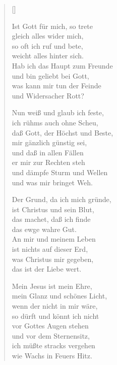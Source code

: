 \begin{multicols}{2}
\settowidth{\versewidth}{Der Grund, da ich mich gründe}
\begin{verse}[\versewidth]

 Ist Gott für mich, so trete\\
gleich alles wider mich,\\
so oft ich ruf und bete,\\
weicht alles hinter sich.\\
Hab ich das Haupt zum Freunde\\
und bin geliebt bei Gott,\\
was kann mir tun der Feinde\\
und Widersacher Rott?

 Nun weiß und glaub ich feste,\\
ich rühms auch ohne Scheu,\\
daß Gott, der Höchst und Beste,\\
mir gänzlich günstig sei,\\
und daß in allen Fällen\\
er mir zur Rechten steh\\
und dämpfe Sturm und Wellen\\
und was mir bringet Weh.

 Der Grund, da ich mich gründe,\\
ist Christus und sein Blut,\\
das machet, daß ich finde\\
das ewge wahre Gut.\\
An mir und meinem Leben\\
ist nichts auf dieser Erd,\\
was Christus mir gegeben,\\
das ist der Liebe wert.

 Mein Jesus ist mein Ehre,\\
mein Glanz und schönes Licht,\\
wenn der nicht in mir wäre,\\
so dürft und könnt ich nicht\\
vor Gottes Augen stehen\\
und vor dem Sternensitz,\\
ich müßte stracks vergehen\\
wie Wachs in Feuers Hitz.


\end{verse}
\end{multicols}
